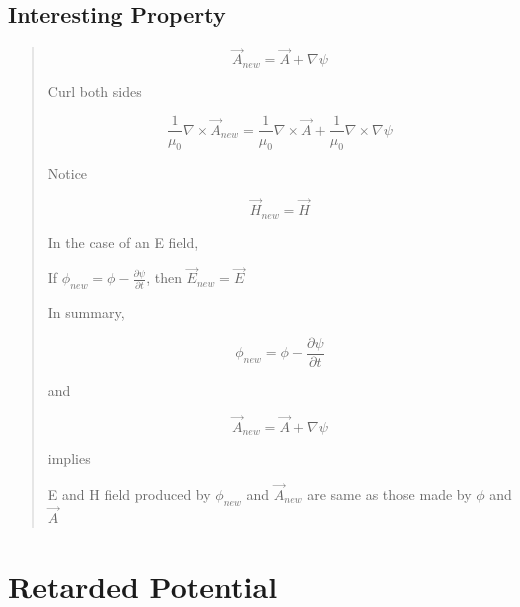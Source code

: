 \documentclass{article} %
\begin{document}
\subsection{Interesting Property}
\begin{quote}
    \[\vec{A}_{new} = \vec{A} + \nabla\psi\]

    Curl both sides

    \[\frac{1}{\mu_0}\nabla \times \vec{A}_{new} = \frac{1}{\mu_0}\nabla \times \vec{A} + \frac{1}{\mu_0}\nabla \times \nabla\psi\]

    Notice

    \[\vec{H}_{new} = \vec{H}\]

    In the case of an E field,

    If $\phi_{new} = \phi - \frac{\partial \psi}{\partial t}$, then $\vec{E}_{new} = \vec{E}$

    \bigskip
    In summary,

    \[\phi_{new} = \phi - \frac{\partial \psi}{\partial t}\]

    and

    \[\vec{A}_{new} = \vec{A} + \nabla\psi\]

    implies

    \bigskip
    E and H field produced by $\phi_{new}$ and $\vec{A}_{new}$ are same as those made by $\phi$ and $\vec{A}$
\end{quote}


\section{Retarded Potential}
\end{document}
